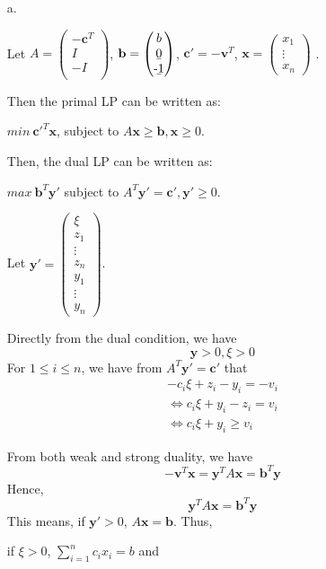 \documentclass[11pt]{article}
\theoremstyle{remark}
\newcommand{\bx}{\mathbf{x}}
\newcommand{\by}{\mathbf{y}}
\newcommand{\bc}{\mathbf{c}}
\begin{document}
\color{blue}

\begin{itemize}
\item[a.]

Let 
$A = 
\begin{pmatrix}
-\bc^T \\
I \\
-I \\
\end{pmatrix}$,
$\textbf{b} = 
\begin{pmatrix}
b \\
\b0 \\
\b{-1} \\
\end{pmatrix}$,
$\bc' = -\textbf{v}^T$,
$\textbf{x} = 
\begin{pmatrix}
x_1 \\
\vdots \\
x_n
\end{pmatrix}$
.

Then the primal LP can be written as:

$min \ \bc'^T \bx$, subject to $A\bx \geq \textbf{b}, \bx\geq 0$.

Then, the dual LP can be written as:

$max \ \textbf{b}^T \by'$ subject to $A^T \by' =\bc', \by' \geq 0$.

Let
$\by' = 
\begin{pmatrix}
\xi \\
z_1 \\
\vdots \\
z_n \\
y_1 \\
\vdots \\
y_n
\end{pmatrix}$.

Directly from the dual condition, we have 
$$\by > 0, \xi >0$$
For $1 \leq i \leq n$, we have from $A^T \by' =\bc'$ that
\begin{align*}
& -c_i \xi + z_i - y_i = -v_i &\\
& \Leftrightarrow c_i \xi + y_i - z_i = v_i &\\
& \Leftrightarrow c_i \xi + y_i \geq v_i 
\end{align*}

From both weak and strong duality, we have
$$-\textbf{v}^T \bx = \by^T A \bx = \textbf{b}^T \by$$
Hence, 
$$\by^T A \bx = \textbf{b}^T \by$$
This means, if $\by' > 0$, $A\bx = \textbf{b}$. Thus,

if $\xi > 0$, $\sum_{i=1}^n c_i x_i = b$ and


\end{itemize}
\end{document}
